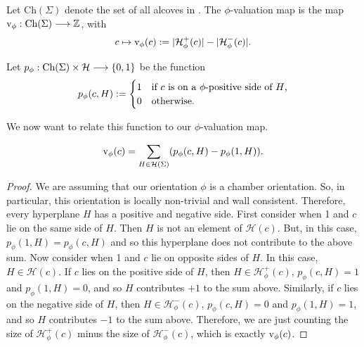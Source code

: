 \documentclass[11pt]{article}
\begin{document}
\begin{definition}
    Let Ch$(\Sigma)$ denote the set of all alcoves in \sg. The $\phi$-valuation map is the map $\textnormal{v}_\phi:\textnormal{Ch}(\Sigma)\longrightarrow\mathbb{Z}$, with
    \[c\mapsto \textnormal{v}_\phi(c):= |\mathcal{H}_{\phi}^+(c)|-|\mathcal{H}_{\phi}^-(c)|.\]
\end{definition}

\begin{definition}
    Let $p_\phi : \textnormal{Ch}(\Sigma)\times \mathcal{H}\longrightarrow \{0,1\}$ be the function 
    \[p_\phi(c,H):= \begin{cases}
        1 & \textnormal{if $c$ is on a $\phi$-positive side of $H$,}\\
        0 & \textnormal{otherwise.}
    \end{cases}\]
\end{definition}

We now want to relate this function to our $\phi$-valuation map.

\begin{lemma}
    \[\textnormal{v}_\phi(c)=\sum_{H\in\mathcal{H}(\Sigma)}(p_{\phi}(c,H)-p_\phi(1,H)).\]
\end{lemma}

\begin{proof}
    We are assuming that our orientation $\phi$ is a chamber orientation. So, in particular, this orientation is locally non-trivial and wall consistent. Therefore, every hyperplane $H$ has a positive and negative side. First consider when 1 and $c$ lie on the same side of $H$. Then $H$ is not an element of $\mathcal{H}(c)$. But, in this case, $p_\phi(1,H)=p_\phi(c,H)$ and so this hyperplane does not contribute to the above sum. 
    Now consider when 1 and $c$ lie on opposite sides of $H$. In this case, $H\in \mathcal{H}(c)$. If $c$ lies on the positive side of $H$, then $H\in\mathcal{H}_{\phi}^+(c)$, $p_\phi(c,H)=1$ and $p_\phi(1,H)=0$, and so $H$ contributes $+1$ to the sum above. Similarly, if $c$ lies on the negative side of $H$, then $H\in\mathcal{H}_{\phi}^-(c)$, $p_\phi(c,H)=0$ and $p_\phi(1,H)=1$, and so $H$ contributes $-1$ to the sum above. Therefore, we are just counting the size of $\mathcal{H}_{\phi}^+(c)$ minus the size of $\mathcal{H}_{\phi}^-(c)$, which is exactly $\textnormal{v}_\phi(c)$. 
\end{proof}


\end{document}
